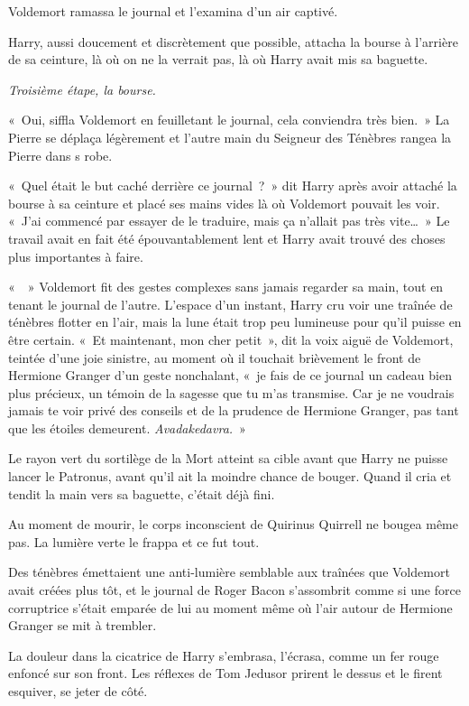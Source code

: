 Voldemort ramassa le journal et l'examina d'un air captivé.

Harry, aussi doucement et discrètement que possible, attacha la bourse à l'arrière de sa ceinture, là où on ne la verrait pas, là où Harry avait mis sa baguette.

\emph{Troisième étape, la bourse.}

«~Oui, siffla Voldemort en feuilletant le journal, cela conviendra très bien.~» La Pierre se déplaça légèrement et l'autre main du Seigneur des Ténèbres rangea la Pierre dans s robe.

«~Quel était le but caché derrière ce journal~?~» dit Harry après avoir attaché la bourse à sa ceinture et placé ses mains vides là où Voldemort pouvait les voir. «~J'ai commencé par essayer de le traduire, mais ça n'allait pas très vite…~» Le travail avait en fait été épouvantablement lent et Harry avait trouvé des choses plus importantes à faire.

«~~» Voldemort fit des gestes complexes sans jamais regarder sa main, tout en tenant le journal de l'autre. L'espace d'un instant, Harry cru voir une traînée de ténèbres flotter en l'air, mais la lune était trop peu lumineuse pour qu'il puisse en être certain. «~Et maintenant, mon cher petit~», dit la voix aiguë de Voldemort, teintée d'une joie sinistre, au moment où il touchait brièvement le front de Hermione Granger d'un geste nonchalant, «~je fais de ce journal un cadeau bien plus précieux, un témoin de la sagesse que tu m'as transmise. Car je ne voudrais jamais te voir privé des conseils et de la prudence de Hermione Granger, pas tant que les étoiles demeurent. \emph{Avadakedavra.}~»

Le rayon vert du sortilège de la Mort atteint sa cible avant que Harry ne puisse lancer le Patronus, avant qu'il ait la moindre chance de bouger. Quand il cria et tendit la main vers sa baguette, c'était déjà fini.

Au moment de mourir, le corps inconscient de Quirinus Quirrell ne bougea même pas. La lumière verte le frappa et ce fut tout.

Des ténèbres émettaient une anti-lumière semblable aux traînées que Voldemort avait créées plus tôt, et le journal de Roger Bacon s'assombrit comme si une force corruptrice s'était emparée de lui au moment même où l'air autour de Hermione Granger se mit à trembler.

La douleur dans la cicatrice de Harry s'embrasa, l'écrasa, comme un fer rouge enfoncé sur son front. Les réflexes de Tom Jedusor prirent le dessus et le firent esquiver, se jeter de côté.

